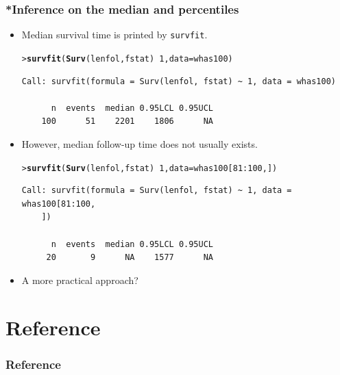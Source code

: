 \documentclass[10pt]{beamer}\usepackage[]{graphicx}\usepackage[]{color}
\makeatletter
\newcommand{\hlnum}[1]{\textcolor[rgb]{0.686,0.059,0.569}{#1}}%
\newcommand{\hlopt}[1]{\textcolor[rgb]{0,0,0}{#1}}%
\newcommand{\hlstd}[1]{\textcolor[rgb]{0.345,0.345,0.345}{#1}}%
\newcommand{\hlkwc}[1]{\textcolor[rgb]{0.333,0.667,0.333}{#1}}%
\newcommand{\hlkwd}[1]{\textcolor[rgb]{0.737,0.353,0.396}{\textbf{#1}}}%
\newenvironment{kframe}{%
 \def\at@end@of@kframe{}%
 \ifinner\ifhmode%
  \def\at@end@of@kframe{\end{minipage}}%
  \begin{minipage}{\columnwidth}%
 \fi\fi%
 \def\FrameCommand##1{\hskip\@totalleftmargin \hskip-\fboxsep
 \colorbox{shadecolor}{##1}\hskip-\fboxsep
     \hskip-\linewidth \hskip-\@totalleftmargin \hskip\columnwidth}%
 \MakeFramed {\advance\hsize-\width
   \@totalleftmargin\z@ \linewidth\hsize
   \@setminipage}}%
 {\par\unskip\endMakeFramed%
 \at@end@of@kframe}
\newenvironment{knitrout}{}{} %
\renewenvironment{knitrout}{\setlength{\topsep}{-.2mm}}{}
\newcommand{\code}[1]{{\texttt{#1}}}
\makeatother
\begin{document}
\begin{frame}[fragile]
  \frametitle{*Inference on the median and percentiles}
  \begin{itemize}  
  \item Median survival time is printed by \code{survfit}.
\begin{knitrout}\scriptsize
{}\color{fgcolor}\begin{kframe}
\begin{alltt}
\hlstd{> }\hlkwd{survfit}\hlstd{(}\hlkwd{Surv}\hlstd{(lenfol, fstat)} \hlopt{~} \hlnum{1}\hlstd{,} \hlkwc{data} \hlstd{= whas100)}
\end{alltt}
\begin{verbatim}
Call: survfit(formula = Surv(lenfol, fstat) ~ 1, data = whas100)

      n  events  median 0.95LCL 0.95UCL 
    100      51    2201    1806      NA 
\end{verbatim}
\end{kframe}
\end{knitrout}
  \item However, median follow-up time does not usually exists.
\begin{knitrout}\scriptsize
{}\color{fgcolor}\begin{kframe}
\begin{alltt}
\hlstd{> }\hlkwd{survfit}\hlstd{(}\hlkwd{Surv}\hlstd{(lenfol, fstat)} \hlopt{~} \hlnum{1}\hlstd{,} \hlkwc{data} \hlstd{= whas100[}\hlnum{81}\hlopt{:}\hlnum{100}\hlstd{,])}
\end{alltt}
\begin{verbatim}
Call: survfit(formula = Surv(lenfol, fstat) ~ 1, data = whas100[81:100, 
    ])

      n  events  median 0.95LCL 0.95UCL 
     20       9      NA    1577      NA 
\end{verbatim}
\end{kframe}
\end{knitrout}
  \item A more practical approach?
  \end{itemize}
\end{frame}


\section{Reference}
\begin{frame}[shrink = 20]
\frametitle{Reference}
\begin{center}
\scriptsize


\end{center}
\end{frame}
\end{document}
